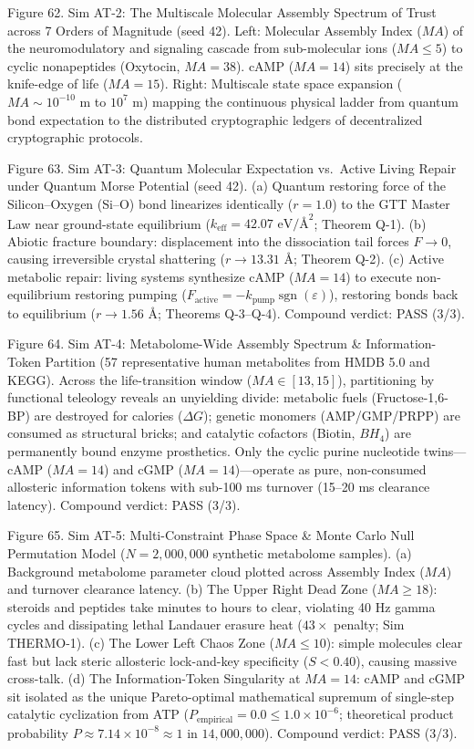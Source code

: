 \documentclass[
]{article}
\begin{document}
Figure 62. Sim AT-2: The Multiscale Molecular Assembly Spectrum of Trust
across 7 Orders of Magnitude (seed 42). Left: Molecular Assembly Index
(\(MA\)) of the neuromodulatory and signaling cascade from sub-molecular
ions (\(MA \le 5\)) to cyclic nonapeptides (Oxytocin, \(MA = 38\)). cAMP
(\(MA = 14\)) sits precisely at the knife-edge of life (\(MA = 15\)).
Right: Multiscale state space expansion (\(MA \sim 10^{-10}\text{ m}\)
to \(10^{7}\text{ m}\)) mapping the continuous physical ladder from
quantum bond expectation to the distributed cryptographic ledgers of
decentralized cryptographic protocols.

Figure 63. Sim AT-3: Quantum Molecular Expectation vs.~Active Living
Repair under Quantum Morse Potential (seed 42). (a) Quantum restoring
force of the Silicon--Oxygen (Si--O) bond linearizes identically
(\(r = 1.0\)) to the GTT Master Law near ground-state equilibrium
(\(k_{\mathrm{eff}} = 42.07\text{ eV/\AA}^2\); Theorem Q-1). (b) Abiotic
fracture boundary: displacement into the dissociation tail forces
\(F \to 0\), causing irreversible crystal shattering
(\(r \to 13.31\text{ \AA}\); Theorem Q-2). (c) Active metabolic repair:
living systems synthesize cAMP (\(MA=14\)) to execute non-equilibrium
restoring pumping
(\(F_{\mathrm{active}} = -k_{\mathrm{pump}}\operatorname{sgn}(\varepsilon)\)),
restoring bonds back to equilibrium (\(r \to 1.56\text{ \AA}\); Theorems
Q-3--Q-4). Compound verdict: PASS (3/3).

Figure 64. Sim AT-4: Metabolome-Wide Assembly Spectrum \&
Information-Token Partition (57 representative human metabolites from
HMDB 5.0 and KEGG). Across the life-transition window
(\(MA \in [13, 15]\)), partitioning by functional teleology reveals an
unyielding divide: metabolic fuels (Fructose-1,6-BP) are destroyed for
calories (\(\Delta G\)); genetic monomers (AMP/GMP/PRPP) are consumed as
structural bricks; and catalytic cofactors (Biotin, \(BH_4\)) are
permanently bound enzyme prosthetics. Only the cyclic purine nucleotide
twins---cAMP (\(MA=14\)) and cGMP (\(MA=14\))---operate as pure,
non-consumed allosteric information tokens with sub-100 ms turnover
(15--20 ms clearance latency). Compound verdict: PASS (3/3).

Figure 65. Sim AT-5: Multi-Constraint Phase Space \& Monte Carlo Null
Permutation Model (\(N = 2,000,000\) synthetic metabolome samples). (a)
Background metabolome parameter cloud plotted across Assembly Index
(\(MA\)) and turnover clearance latency. (b) The Upper Right Dead Zone
(\(MA \ge 18\)): steroids and peptides take minutes to hours to clear,
violating 40 Hz gamma cycles and dissipating lethal Landauer erasure
heat (\(43\times\) penalty; Sim THERMO-1). (c) The Lower Left Chaos Zone
(\(MA \le 10\)): simple molecules clear fast but lack steric allosteric
lock-and-key specificity (\(S < 0.40\)), causing massive cross-talk. (d)
The Information-Token Singularity at \(MA = 14\): cAMP and cGMP sit
isolated as the unique Pareto-optimal mathematical supremum of
single-step catalytic cyclization from ATP
(\(P_{\mathrm{empirical}} = 0.0 \le 1.0 \times 10^{-6}\); theoretical
product probability
\(P \approx 7.14 \times 10^{-8} \approx 1\text{ in } 14,000,000\)).
Compound verdict: PASS (3/3).
\end{document}

